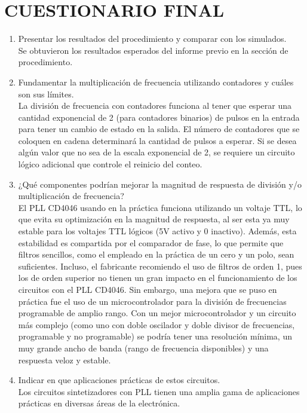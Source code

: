 \section{CUESTIONARIO FINAL}

\begin{enumerate} [label={\arabic*)}]
    \item Presentar los resultados del procedimiento y comparar con los simulados.\\
    Se obtuvieron los resultados esperados del informe previo en la sección de procedimiento.
    \item Fundamentar la multiplicación de frecuencia utilizando contadores y cuáles son sus límites.\\
    La división de frecuencia con contadores funciona al tener que esperar una cantidad exponencial de 2 (para contadores binarios) de pulsos en la entrada para tener un cambio de estado en la salida. El número de contadores que se coloquen en cadena determinará la cantidad de pulsos a esperar. Si se desea algún valor que no sea de la escala exponencial de 2, se requiere un circuito lógico adicional que controle el reinicio del conteo.
    \item ¿Qué componentes podrían mejorar la magnitud de respuesta de división y/o multiplicación de frecuencia?\\
    El PLL CD4046 usando en la práctica funciona utilizando un voltaje TTL, lo que evita su optimización en la magnitud de respuesta, al ser esta ya muy estable para los voltajes TTL  lógicos (5V activo y 0 inactivo). Además, esta estabilidad es compartida por el comparador de fase, lo que permite que filtros sencillos, como el empleado en la práctica de un cero y un polo, sean suficientes. Incluso, el fabricante recomiendo el uso de filtros de orden 1, pues los de orden superior no tienen un gran impacto en el funcionamiento de los circuitos con el PLL CD4046. Sin embargo, una mejora que se puso en práctica fue el uso de un microcontrolador para la división de frecuencias programable de amplio rango. Con un mejor microcontrolador y un circuito más complejo (como uno con doble oscilador y doble divisor de frecuencias, programable y no programable) se podría tener una resolución mínima, un muy grande ancho de banda (rango de frecuencia disponibles) y una respuesta veloz y estable.
    \item Indicar en que aplicaciones prácticas de estos circuitos.\\
    Los circuitos sintetizadores con PLL tienen una amplia gama de aplicaciones prácticas en diversas áreas de la electrónica.

\end{enumerate}
